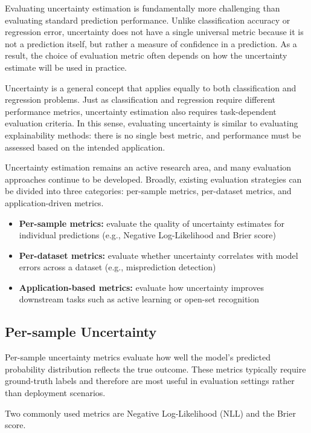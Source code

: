 \documentclass{article}
\begin{document}
Evaluating uncertainty estimation is fundamentally more challenging than evaluating standard prediction performance. Unlike classification accuracy or regression error, uncertainty does not have a single universal metric because it is not a prediction itself, but rather a measure of confidence in a prediction. As a result, the choice of evaluation metric often depends on how the uncertainty estimate will be used in practice.

Uncertainty is a general concept that applies equally to both classification and regression problems. Just as classification and regression require different performance metrics, uncertainty estimation also requires task-dependent evaluation criteria. In this sense, evaluating uncertainty is similar to evaluating explainability methods: there is no single best metric, and performance must be assessed based on the intended application.

Uncertainty estimation remains an active research area, and many evaluation approaches continue to be developed. Broadly, existing evaluation strategies can be divided into three categories: per-sample metrics, per-dataset metrics, and application-driven metrics.

\begin{itemize}
    \item \textbf{Per-sample metrics:} evaluate the quality of uncertainty estimates for individual predictions (e.g., Negative Log-Likelihood and Brier score)
    \item \textbf{Per-dataset metrics:} evaluate whether uncertainty correlates with model errors across a dataset (e.g., misprediction detection)
    \item \textbf{Application-based metrics:} evaluate how uncertainty improves downstream tasks such as active learning or open-set recognition
\end{itemize}

\subsection{Per-sample Uncertainty}

Per-sample uncertainty metrics evaluate how well the model's predicted probability distribution reflects the true outcome. These metrics typically require ground-truth labels and therefore are most useful in evaluation settings rather than deployment scenarios.

Two commonly used metrics are Negative Log-Likelihood (NLL) and the Brier score.
\end{document}
